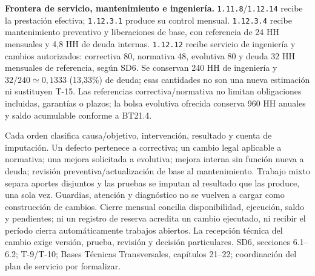 \textbf{Frontera de servicio, mantenimiento e ingeniería.} \texttt{1.11.8}/\texttt{1.12.14} recibe la prestación efectiva; \texttt{1.12.3.1} produce su control mensual. \texttt{1.12.3.4} recibe mantenimiento preventivo y liberaciones de base, con referencia de 24 HH mensuales y 4,8 HH de deuda internas. \texttt{1.12.12} recibe servicio de ingeniería y cambios autorizados: correctiva 80, normativa 48, evolutiva 80 y deuda 32 HH mensuales de referencia, según SD6. Se conservan 240 HH de ingeniería y $32/240\simeq0{,}1333$ (13,33\%) de deuda; esas cantidades no son una nueva estimación ni sustituyen T-15. Las referencias correctiva/normativa no limitan obligaciones incluidas, garantías o plazos; la bolsa evolutiva ofrecida conserva 960 HH anuales y saldo acumulable conforme a BT21.4.

Cada orden clasifica causa/objetivo, intervención, resultado y cuenta de imputación. Un defecto pertenece a correctiva; un cambio legal aplicable a normativa; una mejora solicitada a evolutiva; mejora interna sin función nueva a deuda; revisión preventiva/actualización de base al mantenimiento. Trabajo mixto separa aportes disjuntos y las pruebas se imputan al resultado que las produce, una sola vez. Guardias, atención y diagnóstico no se vuelven a cargar como construcción de cambios. Cierre mensual concilia disponibilidad, ejecución, saldo y pendientes; ni un registro de reserva acredita un cambio ejecutado, ni recibir el período cierra automáticamente trabajos abiertos. La recepción técnica del cambio exige versión, prueba, revisión y decisión particulares. SD6, secciones 6.1--6.2; T-9/T-10; Bases Técnicas Transversales, capítulos 21--22; coordinación del plan de servicio por formalizar.

